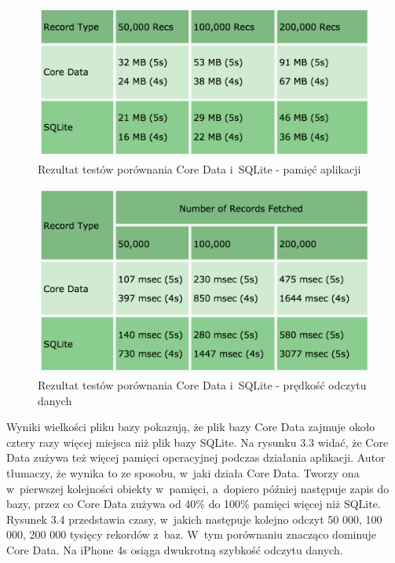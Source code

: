 \begin{figure}
\centering
	\includegraphics[width=13cm]{img/drdobbs_memory_test.png}
	\caption{Rezultat testów porównania Core Data i~SQLite - pamięć aplikacji}
	\label{fig: CoreData_SQLite_memory_test}
\end{figure}

\begin{figure}
\centering
	\includegraphics[width=13cm]{img/drdobbs_speed_test.png}
	\caption{Rezultat testów porównania Core Data i~SQLite - prędkość odczytu danych}
	\label{fig: CoreData_SQLite_speed_test}
\end{figure}
\clearpage

Wyniki wielkości pliku bazy pokazują, że plik bazy Core Data zajmuje około cztery razy więcej miejsca niż plik bazy SQLite. Na rysunku 3.3 widać, że Core Data zużywa też więcej pamięci operacyjnej podczas działania aplikacji. Autor tłumaczy, że wynika to ze sposobu, w~jaki działa Core Data. Tworzy ona w~pierwszej kolejności obiekty w~pamięci, a~dopiero później następuje zapis do bazy, przez co Core Data zużywa od 40\% do 100\% pamięci więcej niż SQLite. Rysunek 3.4 przedstawia czasy, w~jakich następuje kolejno odczyt 50 000, 100 000, 200 000 tysięcy rekordów z~baz. W~tym porównaniu znacząco dominuje Core Data. Na iPhone 4s osiąga dwukrotną szybkość odczytu danych. 

